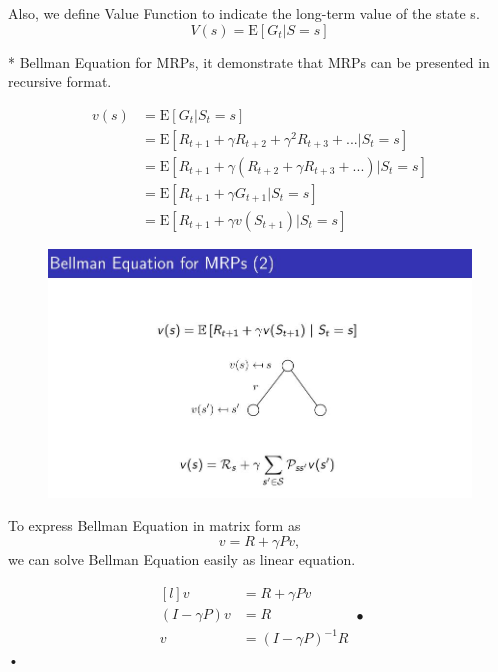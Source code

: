\documentclass[10pt, a4paper, twocolumn]{article} %
\begin{document}
Also, we define Value Function to indicate the long-term value of the state s. $$ V(s) = \textrm{E} [G_{t} | S = s] $$

* Bellman Equation for MRPs, it demonstrate that MRPs can be presented in recursive format.


\begin{equation*}
	\begin{aligned}
		\displaystyle
		v(s) &= \textrm{E} [G_{t} | S_{t} = s] \\
		&= \textrm{E} [R_{t+1} + \gamma R_{t+2} + \gamma^{2} R_{t+3} + ... | S_{t} = s] \\
		&= \textrm{E} [R_{t+1} + \gamma (R_{t+2} + \gamma R_{t+3} + ...) | S_{t} = s] \\
		&= \textrm{E} [R_{t+1} + \gamma G_{t+1} | S_{t} = s]\\ 
		&= \textrm{E} [R_{t+1} + \gamma v(S_{t+1}) | S_{t} = s]
	\end{aligned}
\end{equation*}

\begin{figure}
	\begin{centering}
		\includegraphics[width = \linewidth]{bellman.jpg}
	\end{centering}
\end{figure}

To express Bellman Equation in matrix form as $$v = R + \gamma P v,$$ we can solve Bellman Equation easily as linear equation.

\begin{equation*}
	\begin{aligned}[l]
		v &= R + \gamma P v \\
		(I - \gamma P)v &= R \\
		v &= (I - \gamma P)^{-1}R
	\end{aligned}•	
\end{equation*}•
\end{document}
